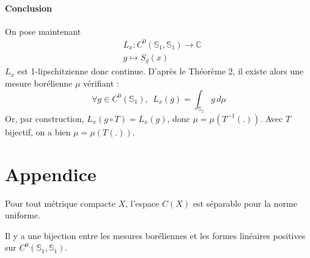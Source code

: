 \documentclass{article}
\begin{document}
\paragraph{Conclusion}
On pose maintenant 
\[
\begin{aligned}
&L_x: C^0(\mathbb{S}_1,\mathbb{S}_1) \to \mathbb{C} \\
&g \mapsto S_g(x)
\end{aligned}
\]
$L_x$ est 1-lipschitzienne donc continue. D'après le Théorème 2, il existe alors une mesure borélienne $\mu$ vérifiant :
\[
\forall g \in C^0(\mathbb{S}_1), \: \: L_x(g) = \int_{\mathbb{S}_1} g \, d\mu
\]
Or, par construction, $L_x(g \circ T) = L_x(g)$, donc $\mu = \mu(T^{-1}(.))$. Avec $T$ bijectif, on a bien $\mu = \mu(T(.))$.

\section*{Appendice}
\begin{mthm}{1}\label{foo}
Pour tout métrique compacte $X$, l'espace $C(X)$ est séparable pour la norme uniforme.
\end{mthm}

\begin{mthm}{2}\label{foo}
Il y a une bijection entre les mesures boréliennes et les formes linéaires positives sur $C^0(\mathbb{S}_1,\mathbb{S}_1)$.
\end{mthm}
\end{document}
